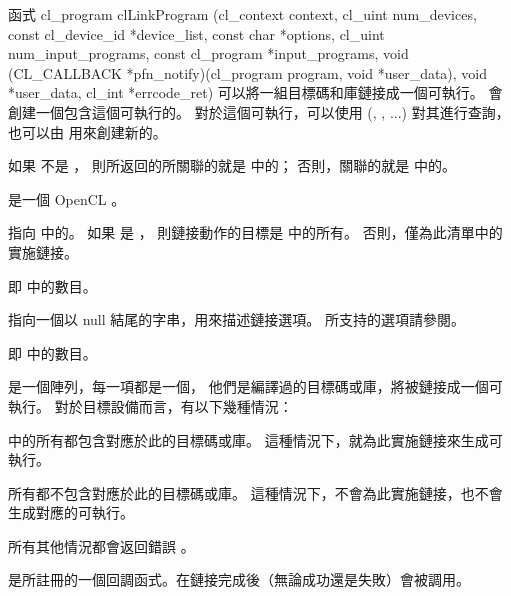 函式
\startclc
cl_program clLinkProgram (cl_context context,
			cl_uint num_devices,
			const cl_device_id *device_list,
			const char *options,
			cl_uint num_input_programs,
			const cl_program *input_programs,
			void (CL_CALLBACK *pfn_notify)(cl_program program,
						void *user_data),
			void *user_data,
cl_int *errcode_ret)
\stopclc
可以將一組目標碼和庫鏈接成一個可執行。
  會創建一個包含這個可執行的。
對於這個可執行，可以使用 (,
 , ...) 對其進行查詢，
也可以由  用來創建新的。

如果  不是 ，
則所返回的所關聯的就是  中的；
否則，關聯的就是  中的。

 是一個 OpenCL 。

 指向  中的。
如果  是 ，
則鏈接動作的目標是  中的所有。
否則，僅為此清單中的實施鏈接。

 即  中的數目。

 指向一個以 null 結尾的字串，用來描述鏈接選項。
所支持的選項請參閱。

 即  中的數目。

 是一個陣列，每一項都是一個，
他們是編譯過的目標碼或庫，將被鏈接成一個可執行。
對於目標設備而言，有以下幾種情況：
\startigBase
\item {} 中的所有都包含對應於此的目標碼或庫。
這種情況下，就為此實施鏈接來生成可執行。

\item 所有都不包含對應於此的目標碼或庫。
這種情況下，不會為此實施鏈接，也不會生成對應的可執行。

\item 所有其他情況都會返回錯誤 。
\stopigBase

 是所註冊的一個回調函式。在鏈接完成後（無論成功還是失敗）會被調用。

